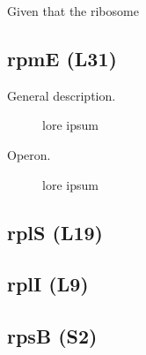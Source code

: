 Given that the ribosome




\subsection{rpmE (L31)}
\begin{description}
    \item[General description.] lore ipsum
    \item[Operon.] lore ipsum
\end{description}

\subsection{rplS (L19)}
\subsection{rplI (L9)}
\subsection{rpsB (S2)}



